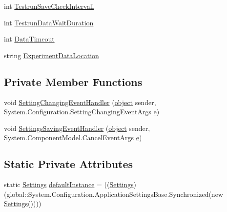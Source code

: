 \begin{DoxyCompactItemize}
\item 
int \hyperlink{class_web_analyzer_1_1_properties_1_1_settings_a3160d237b811df98aeb601487fa43943}{Testrun\+Save\+Check\+Intervall}
\item 
int \hyperlink{class_web_analyzer_1_1_properties_1_1_settings_a4fa938c23f07358746ab269d717fd087}{Testrun\+Data\+Wait\+Duration}
\item 
int \hyperlink{class_web_analyzer_1_1_properties_1_1_settings_a0c6ee531ecb7669be322d0b6adbbed8a}{Data\+Timeout}
\item 
string \hyperlink{class_web_analyzer_1_1_properties_1_1_settings_ac417a6538207823d18cdddedf21e8313}{Experiment\+Data\+Location}
\end{DoxyCompactItemize}
\subsection*{Private Member Functions}
\begin{DoxyCompactItemize}
\item 
void \hyperlink{class_web_analyzer_1_1_properties_1_1_settings_ade54623f5935cf04300ab15254d1a846}{Setting\+Changing\+Event\+Handler} (\hyperlink{_u_i_2_h_t_m_l_resources_2js_2lib_2underscore_8min_8js_aae18b7515bb2bc4137586506e7c0c903}{object} sender, System.\+Configuration.\+Setting\+Changing\+Event\+Args \hyperlink{_u_i_2_h_t_m_l_resources_2js_2lib_2bootstrap_8min_8js_ab5902775854a8b8440bcd25e0fe1c120}{e})
\item 
void \hyperlink{class_web_analyzer_1_1_properties_1_1_settings_a539f50459d03d0782e76117c5a3ed3eb}{Settings\+Saving\+Event\+Handler} (\hyperlink{_u_i_2_h_t_m_l_resources_2js_2lib_2underscore_8min_8js_aae18b7515bb2bc4137586506e7c0c903}{object} sender, System.\+Component\+Model.\+Cancel\+Event\+Args \hyperlink{_u_i_2_h_t_m_l_resources_2js_2lib_2bootstrap_8min_8js_ab5902775854a8b8440bcd25e0fe1c120}{e})
\end{DoxyCompactItemize}
\subsection*{Static Private Attributes}
\begin{DoxyCompactItemize}
\item 
static \hyperlink{class_web_analyzer_1_1_properties_1_1_settings}{Settings} \hyperlink{class_web_analyzer_1_1_properties_1_1_settings_a384f24a72fe5cd4bd437c9fdecf5e8ce}{default\+Instance} = ((\hyperlink{class_web_analyzer_1_1_properties_1_1_settings}{Settings})(global\+::\+System.\+Configuration.\+Application\+Settings\+Base.\+Synchronized(new \hyperlink{class_web_analyzer_1_1_properties_1_1_settings}{Settings}())))
\end{DoxyCompactItemize}


